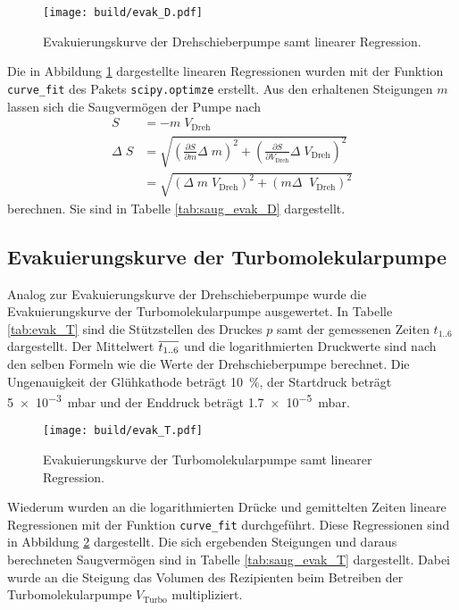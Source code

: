 \begin{figure}
  \centering
  \texttt{[image: build/evak\_D.pdf]}
  \caption{Evakuierungskurve der Drehschieberpumpe samt linearer Regression.}
  \label{fig:evak_D}
\end{figure}

Die in Abbildung \ref{fig:evak_D} dargestellte linearen Regressionen wurden
mit der Funktion \texttt{curve\_fit} des Pakets \texttt{scipy.optimze} \cite{scipy}
erstellt. Aus den erhaltenen Steigungen $m$ lassen sich die Saugvermögen der Pumpe
nach
\begin{align*}
    S &= - m \; V_\text{Dreh} \\
    \Delta \; S &=
    \sqrt{\left(\frac{\partial S}{\partial m} \Delta \; m\right)^2 +
    \left(\frac{\partial S}{\partial V_\text{Dreh}} \Delta \; V_\text{Dreh}\right)^2} \\
    &=
    \sqrt{\left(\Delta \; m \; V_\text{Dreh}\right)^2 +
    \left(m \Delta \; \; V_\text{Dreh}\right)^2}
\end{align*}
berechnen. Sie sind in Tabelle \ref{tab:saug_evak_D} dargestellt.


\FloatBarrier


\subsection{Evakuierungskurve der Turbomolekularpumpe}
\label{sec:AuswEvaT}

Analog zur Evakuierungskurve der Drehschieberpumpe wurde die Evakuierungskurve
der Turbomolekularpumpe ausgewertet. In Tabelle \ref{tab:evak_T} sind die
Stützstellen des Druckes $p$ samt der gemessenen Zeiten $t_\text{1..6}$
dargestellt. Der Mittelwert $\overline{t_\text{1..6}}$ und die logarithmierten
Druckwerte sind nach den selben Formeln wie die Werte der Drehschieberpumpe
berechnet. Die Ungenauigkeit der Glühkathode beträgt \SI{10}{\percent}, der
Startdruck beträgt \SI{5e-3}{\milli\bar} und der Enddruck beträgt
\SI{1.7e-5}{\milli\bar}.



\begin{figure}
  \centering
  \texttt{[image: build/evak\_T.pdf]}
  \caption{Evakuierungskurve der Turbomolekularpumpe samt linearer Regression.}
  \label{fig:evak_T}
\end{figure}

Wiederum wurden an die logarithmierten Drücke und gemittelten Zeiten
lineare Regressionen mit der Funktion \texttt{curve\_fit} durchgeführt.
Diese Regressionen sind in Abbildung \ref{fig:evak_T} dargestellt.
Die sich ergebenden Steigungen und daraus berechneten Saugvermögen sind in
Tabelle \ref{tab:saug_evak_T} dargestellt. Dabei wurde an die Steigung das
Volumen des Rezipienten beim Betreiben der Turbomolekularpumpe $V_\text{Turbo}$
multipliziert.

